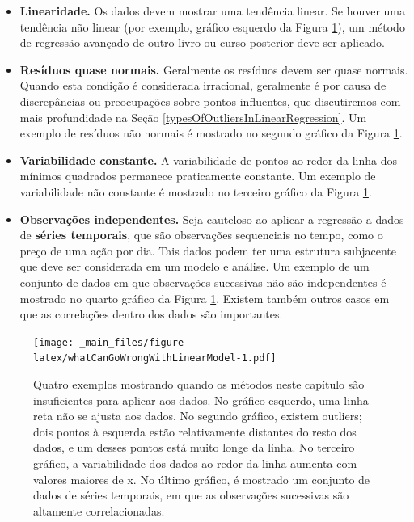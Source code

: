 \documentclass[
]{book}
\theoremstyle{definition}
\theoremstyle{definition}
\theoremstyle{definition}
\theoremstyle{definition}
\theoremstyle{remark}
\begin{document}
\begin{itemize}
\item
  \textbf{Linearidade.} Os dados devem mostrar uma tendência linear. Se houver uma tendência não linear (por exemplo, gráfico esquerdo da Figura \ref{fig:whatCanGoWrongWithLinearModel}), um método de regressão avançado de outro livro ou curso posterior deve ser aplicado.
\item
  \textbf{Resíduos quase normais.} Geralmente os resíduos devem ser quase normais. Quando esta condição é considerada irracional, geralmente é por causa de discrepâncias ou preocupações sobre pontos influentes, que discutiremos com mais profundidade na Seção \ref{typesOfOutliersInLinearRegression}. Um exemplo de resíduos não normais é mostrado no segundo gráfico da Figura \ref{fig:whatCanGoWrongWithLinearModel}.
\item
  \textbf{Variabilidade constante.} A variabilidade de pontos ao redor da linha dos mínimos quadrados permanece praticamente constante. Um exemplo de variabilidade não constante é mostrado no terceiro gráfico da Figura \ref{fig:whatCanGoWrongWithLinearModel}.
\item
  \textbf{Observações independentes.} Seja cauteloso ao aplicar a regressão a dados de \textbf{séries temporais}, que são observações sequenciais no tempo, como o preço de uma ação por dia. Tais dados podem ter uma estrutura subjacente que deve ser considerada em um modelo e análise. Um exemplo de um conjunto de dados em que observações sucessivas não são independentes é mostrado no quarto gráfico da Figura \ref{fig:whatCanGoWrongWithLinearModel}. Existem também outros casos em que as correlações dentro dos dados são importantes.
\end{itemize}

\begin{figure}
\centering
\texttt{[image: \_main\_files/figure-latex/whatCanGoWrongWithLinearModel-1.pdf]}
\caption{\label{fig:whatCanGoWrongWithLinearModel}Quatro exemplos mostrando quando os métodos neste capítulo são insuficientes para aplicar aos dados. No gráfico esquerdo, uma linha reta não se ajusta aos dados. No segundo gráfico, existem outliers; dois pontos à esquerda estão relativamente distantes do resto dos dados, e um desses pontos está muito longe da linha. No terceiro gráfico, a variabilidade dos dados ao redor da linha aumenta com valores maiores de x. No último gráfico, é mostrado um conjunto de dados de séries temporais, em que as observações sucessivas são altamente correlacionadas.}
\end{figure}
\end{document}
